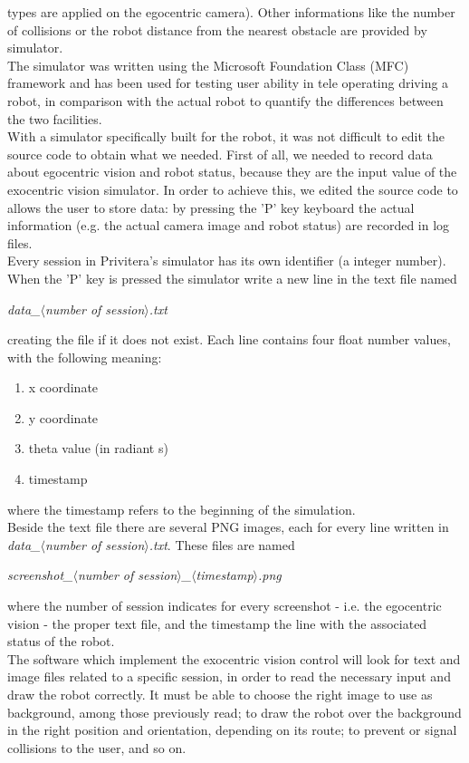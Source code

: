 types are applied on the egocentric camera). Other informations 
like the number of collisions or the robot distance from the 
nearest obstacle are provided by simulator.
\\
The simulator was written using the Microsoft Foundation Class
(MFC) framework and has been used for testing user ability in
tele operating driving a robot, in comparison with the actual 
robot to quantify the differences between the two facilities. 
\\
With a simulator specifically built for the \morduc{} robot, it 
was not difficult to edit the source code to obtain what we 
needed. First of all, we needed to record data about egocentric 
vision and robot status, because they are the input value 
of the exocentric vision simulator. In order to achieve this, 
we edited the source code to allows the user to store data: by 
pressing the 'P' key keyboard the actual information (e.g. the 
actual camera image and robot status) are recorded in log files.
\\
Every session in Privitera's simulator has its own identifier 
(a integer number). When the 'P' key is pressed the simulator 
write a new line in the text file named

\begin{center}
  \textit{data\_$\langle$number of session$\rangle$.txt}
\end{center}

creating the file if it does not 
exist. Each line contains four float number values, with the 
following meaning:

\begin{enumerate}
\item x coordinate
\item y coordinate
\item theta value (in radiant s)
\item timestamp
\end{enumerate}

where the timestamp refers to the beginning of the simulation.
\\
Beside the text file there are several PNG images, each for every 
line written in \textit{data\_$\langle$number of 
session$\rangle$.txt}.
These files are named

\begin{center}
  \textit{screenshot\_$\langle$number of 
    session$\rangle$\_$\langle$timestamp$\rangle$.png}
\end{center}

where the 
number of session indicates for every screenshot 
- i.e. the egocentric vision - the proper text file, and the 
timestamp the line with the associated status of the robot.
\\
The software which implement the exocentric vision control 
will look for text and image files related to a specific 
session, in order to read the necessary input and draw the 
robot correctly. It must be able to choose the right image 
to use as background, among those previously read; to draw 
the robot over the background in the right position and 
orientation, depending on its route; to prevent or signal 
collisions to the user, and so on.
